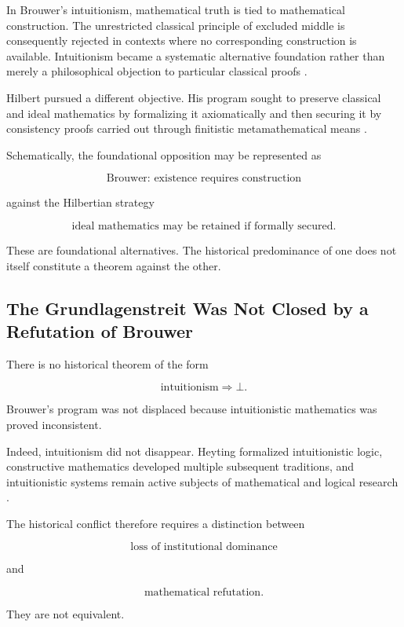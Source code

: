 \documentclass[11pt,a4paper]{article}
\begin{document}
In Brouwer's intuitionism, mathematical truth is tied to mathematical
construction. The unrestricted classical principle of excluded middle
is consequently rejected in contexts where no corresponding
construction is available. Intuitionism became a systematic
alternative foundation rather than merely a philosophical objection
to particular classical proofs
\cite{SEPIntuitionism,SEPConstructiveMathematics}.

Hilbert pursued a different objective. His program sought to preserve
classical and ideal mathematics by formalizing it axiomatically and
then securing it by consistency proofs carried out through finitistic
metamathematical means \cite{SEPHilbertProgram}.

Schematically, the foundational opposition may be represented as

\[
\boxed{
\text{Brouwer: existence requires construction}
}
\]

against the Hilbertian strategy

\[
\boxed{
\text{ideal mathematics may be retained if formally secured}.
}
\]

These are foundational alternatives. The historical predominance of
one does not itself constitute a theorem against the other.

\subsection{The Grundlagenstreit Was Not Closed by a Refutation of Brouwer}

There is no historical theorem of the form

\[
\text{intuitionism}\Longrightarrow\bot.
\]

Brouwer's program was not displaced because intuitionistic mathematics
was proved inconsistent.

Indeed, intuitionism did not disappear. Heyting formalized
intuitionistic logic, constructive mathematics developed multiple
subsequent traditions, and intuitionistic systems remain active
subjects of mathematical and logical research
\cite{SEPIntuitionism,SEPConstructiveMathematics}.

The historical conflict therefore requires a distinction between

\[
\text{loss of institutional dominance}
\]

and

\[
\text{mathematical refutation}.
\]

They are not equivalent.
\end{document}
